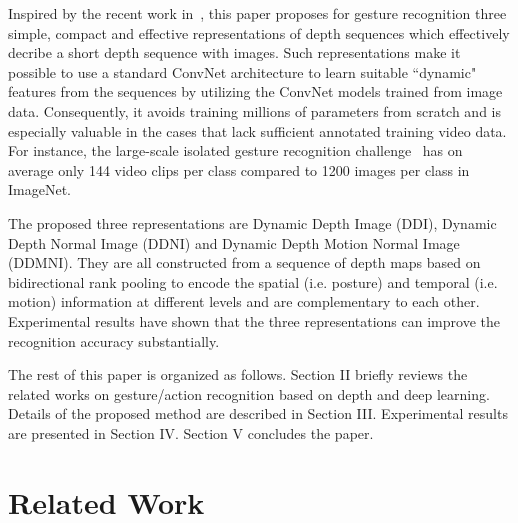 \documentclass[10pt, a4paper, conference]{IEEEtran}
\begin{document}
Inspired by the recent work in~\cite{pichao2015,pichaoTHMS,pichao2016,bilen2016dynamic}, this paper proposes for gesture recognition three simple, compact and effective representations of depth sequences which effectively decribe a short depth sequence with images. Such representations make it possible to use a standard ConvNet architecture to learn suitable ``dynamic" features from the sequences by utilizing the ConvNet models trained from image data. Consequently, it avoids training millions of parameters from scratch and is especially valuable in the cases that lack sufficient annotated training video data. For instance, the large-scale isolated gesture recognition challenge~\cite{wanchalearn} has on average only 144 video clips per class compared to 1200 images per class in ImageNet.



The proposed three representations are Dynamic Depth Image (DDI), Dynamic Depth Normal Image (DDNI) and Dynamic Depth Motion Normal Image (DDMNI). They are all constructed from a sequence of depth maps based on bidirectional rank pooling to encode the spatial (i.e. posture) and temporal (i.e. motion) information at different levels and are complementary to each other. Experimental results have shown that the three representations can improve the recognition accuracy substantially. 

The rest of this paper is organized as follows. Section II briefly reviews the related works on gesture/action recognition based on depth and deep learning. Details of the proposed method are described in Section III. Experimental results are presented in Section IV. Section V concludes the paper.

\section{Related Work}
\end{document}
